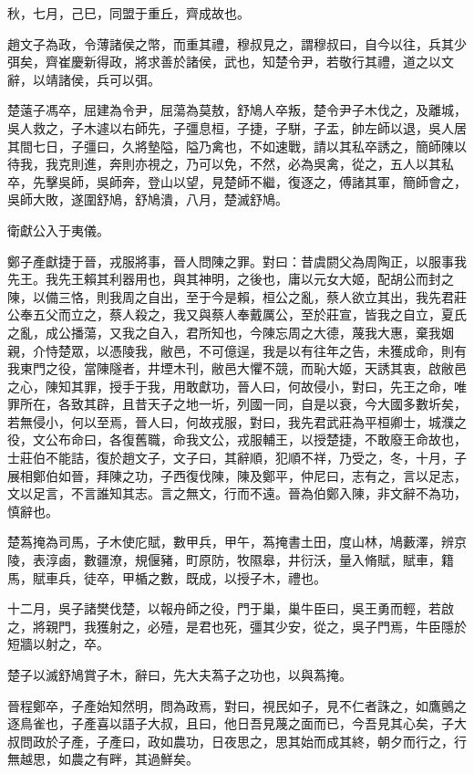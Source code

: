 \begin{pinyinscope}
秋，七月，己巳，同盟于重丘，齊成故也。

趙文子為政，令薄諸侯之幣，而重其禮，穆叔見之，謂穆叔曰，自今以往，兵其少弭矣，齊崔慶新得政，將求善於諸侯，武也，知楚令尹，若敬行其禮，道之以文辭，以靖諸侯，兵可以弭。

楚薳子馮卒，屈建為令尹，屈蕩為莫敖，舒鳩人卒叛，楚令尹子木伐之，及離城，吳人救之，子木遽以右師先，子彊息桓，子捷，子駢，子盂，帥左師以退，吳人居其間七日，子彊曰，久將墊隘，隘乃禽也，不如速戰，請以其私卒誘之，簡師陳以待我，我克則進，奔則亦視之，乃可以免，不然，必為吳禽，從之，五人以其私卒，先擊吳師，吳師奔，登山以望，見楚師不繼，復逐之，傅諸其軍，簡師會之，吳師大敗，遂圍舒鳩，舒鳩潰，八月，楚滅舒鳩。

衛獻公入于夷儀。

鄭子產獻捷于晉，戎服將事，晉人問陳之罪。對曰：昔虞閼父為周陶正，以服事我先王。我先王賴其利器用也，與其神明，之後也，庸以元女大姬，配胡公而封之陳，以備三恪，則我周之自出，至于今是賴，桓公之亂，蔡人欲立其出，我先君莊公奉五父而立之，蔡人殺之，我又與蔡人奉戴厲公，至於莊宣，皆我之自立，夏氏之亂，成公播蕩，又我之自入，君所知也，今陳忘周之大德，蔑我大惠，棄我姻親，介恃楚眾，以憑陵我，敝邑，不可億逞，我是以有往年之告，未獲成命，則有我東門之役，當陳隧者，井堙木刊，敝邑大懼不競，而恥大姬，天誘其衷，啟敝邑之心，陳知其罪，授手于我，用敢獻功，晉人曰，何故侵小，對曰，先王之命，唯罪所在，各致其辟，且昔天子之地一圻，列國一同，自是以衰，今大國多數圻矣，若無侵小，何以至焉，晉人曰，何故戎服，對曰，我先君武莊為平桓卿士，城濮之役，文公布命曰，各復舊職，命我文公，戎服輔王，以授楚捷，不敢廢王命故也，士莊伯不能詰，復於趙文子，文子曰，其辭順，犯順不祥，乃受之，冬，十月，子展相鄭伯如晉，拜陳之功，子西復伐陳，陳及鄭平，仲尼曰，志有之，言以足志，文以足言，不言誰知其志。言之無文，行而不遠。晉為伯鄭入陳，非文辭不為功，慎辭也。

楚蒍掩為司馬，子木使庀賦，數甲兵，甲午，蒍掩書土田，度山林，鳩藪澤，辨京陵，表淳鹵，數疆潦，規偃豬，町原防，牧隰皋，井衍沃，量入脩賦，賦車，籍馬，賦車兵，徒卒，甲楯之數，既成，以授子木，禮也。

十二月，吳子諸樊伐楚，以報舟師之役，門于巢，巢牛臣曰，吳王勇而輕，若啟之，將親門，我獲射之，必殪，是君也死，彊其少安，從之，吳子門焉，牛臣隱於短牆以射之，卒。

楚子以滅舒鳩賞子木，辭曰，先大夫蒍子之功也，以與蒍掩。

晉程鄭卒，子產始知然明，問為政焉，對曰，視民如子，見不仁者誅之，如鷹鸇之逐鳥雀也，子產喜以語子大叔，且曰，他日吾見蔑之面而已，今吾見其心矣，子大叔問政於子產，子產曰，政如農功，日夜思之，思其始而成其終，朝夕而行之，行無越思，如農之有畔，其過鮮矣。


\end{pinyinscope}
